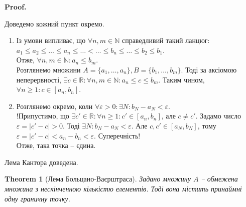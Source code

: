 \documentclass[a4paper, 14pt]{article}
\makeatletter
\def\qed{$\blacksquare$}
\theoremstyle{theoremdd}
\newtheorem{theorem}{Theorem}[subsection]
\theoremstyle{theoremdd}
\theoremstyle{theoremdd}
\theoremstyle{theoremdd}
\theoremstyle{theoremdd}
\theoremstyle{theoremdd}
\theoremstyle{theoremdd}
\theoremstyle{theoremdd}
\renewenvironment{proof}[1][Proof.\\]{\par
\pushQED{\hfill \qed}%
\normalfont \topsep6\p@\@plus6\p@\relax
\trivlist
\item\relax
{\bfseries
#1\@addpunct{.}}\hspace\labelsep\ignorespaces
}{%
\popQED\endtrivlist\@endpefalse
}
\makeatother
\begin{document}
	\begin{proof}
	Доведемо кожний пункт окремо.
	\begin{enumerate}[wide=0pt,label={\arabic*)}]
	\item Із умови випливає, що $\forall n,m \in \mathbb{N}$ справедливий такий ланцюг:\\
	$a_1 \leq a_2 \leq \dots \leq a_n \leq \dots < \dots \leq b_n \leq \dots \leq b_2 \leq b_1$.\\
	Отже, $\forall n,m \in \mathbb{N}: a_n \leq b_m$.\\
	Розглянемо множини $A = \{a_1,\dots,a_n\}, B = \{b_1, \dots, b_m\}$.
	Тоді за аксіомою неперервності, $\exists c \in \mathbb{R}: \forall n,m \in \mathbb{N}: a_n \leq c \leq b_m$. Таким чином, $\forall n \geq 1: c \in [a_n,b_n]$.
	\item Розглянемо окремо, коли $\forall \varepsilon > 0: \exists N: b_N - a_N < \varepsilon$.\\
	!Припустимо, що $\exists c' \in \mathbb{R}: \forall n \geq 1: c' \in [a_n,b_n]$, але $c \neq c'$. Задамо число $\varepsilon = |c' - c| > 0$. Тоді $\exists N: b_N - a_N < \varepsilon$. Але $c,c' \in [a_N,b_N]$, тому $\varepsilon = |c'-c| < a_n-b_n < \varepsilon$. Суперечність!\\
	Отже, така точка -- єдина.
	\end{enumerate}
	Лема Кантора доведена.
	\end{proof}
	
	\begin{theorem}[Лема Больцано-Ваєрштраса]
	Задано множину $A$ -- обмежена множина з нескінченною кількістю елементів. Тоді вона містить принаймні одну граничну точку.
	\end{theorem}
	
\end{document}
